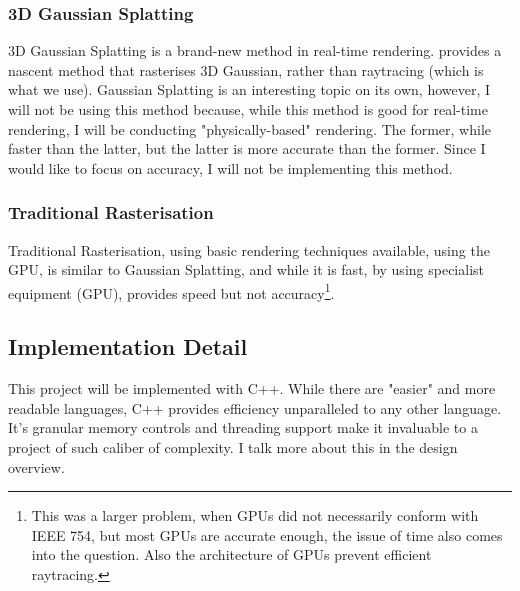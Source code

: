 \documentclass[../main.tex]{subfiles}
\begin{document}
\subsubsection{3D Gaussian Splatting}
3D Gaussian Splatting is a brand-new method in real-time rendering.\cite{kerbl3DGaussianSplatting2023} provides a nascent method that rasterises 3D Gaussian, rather than raytracing (which is what we use). Gaussian Splatting is an interesting topic on its own, however, I will not be using this method because, while this method is good for real-time rendering, I will be conducting "physically-based" rendering. The former, while faster than the latter, but the latter is more accurate than the former. Since I would like to focus on accuracy, I will not be implementing this method.
\subsubsection{Traditional Rasterisation}
Traditional Rasterisation, using basic rendering techniques available, using the GPU, is similar to Gaussian Splatting, and while it is fast, by using specialist equipment (GPU), provides speed but not accuracy\footnote{This was a larger problem, when GPUs did not necessarily conform with IEEE 754, but most GPUs are accurate enough, the issue of time also comes into the question. Also the architecture of GPUs prevent efficient raytracing.}. 

\subsection{Implementation Detail}
This project will be implemented with C++. While there are "easier" and more readable languages, C++ provides efficiency unparalleled to any other language. It's granular memory controls and threading support make it invaluable to a project of such caliber of complexity. I talk more about this in the design overview.
\end{document}
